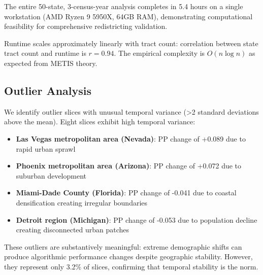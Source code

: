 The entire 50-state, 3-census-year analysis completes in 5.4 hours on a single workstation (AMD Ryzen 9 5950X, 64GB RAM), demonstrating computational feasibility for comprehensive redistricting validation.

Runtime scales approximately linearly with tract count: correlation between state tract count and runtime is $r=0.94$. The empirical complexity is $O(n \log n)$ as expected from METIS theory.

\subsection{Outlier Analysis}

We identify outlier slices with unusual temporal variance (>2 standard deviations above the mean). Eight slices exhibit high temporal variance:
\begin{itemize}
    \item \textbf{Las Vegas metropolitan area (Nevada)}: PP change of +0.089 due to rapid urban sprawl
    \item \textbf{Phoenix metropolitan area (Arizona)}: PP change of +0.072 due to suburban development
    \item \textbf{Miami-Dade County (Florida)}: PP change of -0.041 due to coastal densification creating irregular boundaries
    \item \textbf{Detroit region (Michigan)}: PP change of -0.053 due to population decline creating disconnected urban patches
\end{itemize}

These outliers are substantively meaningful: extreme demographic shifts can produce algorithmic performance changes despite geographic stability. However, they represent only 3.2\% of slices, confirming that temporal stability is the norm.
